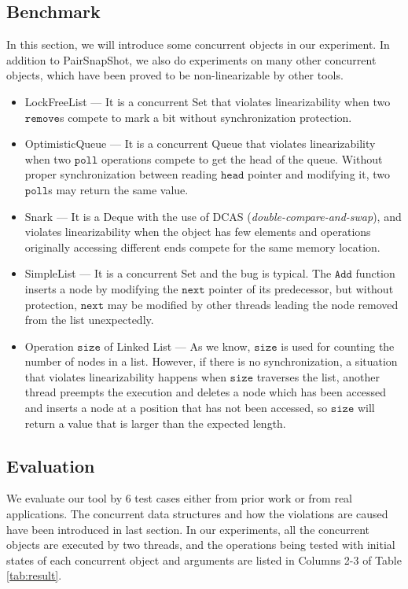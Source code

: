 \documentclass[runningheads]{llncs}
\begin{document}
\subsection{Benchmark}\label{sec:benchmarks}
In this section, we will introduce some concurrent objects in our experiment. 
In addition to PairSnapShot, we also do experiments on many other concurrent objects, which have been proved to be non-linearizable by other tools.

\begin{itemize}
  \item LockFreeList \cite{herlihy2012art} --- It is a concurrent Set that violates linearizability when two $\mathtt{remove}$s compete to mark a bit without synchronization protection.
  \item OptimisticQueue \cite{DBLP:conf/wdag/Ladan-MozesS04} --- It is a concurrent Queue that violates linearizability when two $\mathtt{poll}$ operations compete to get the head of the queue. Without proper synchronization between reading $\mathtt{head}$ pointer and modifying it, two $\mathtt{poll}$s may return the same value.

  \item Snark \cite{DBLP:conf/spaa/DohertyDGFLMMSS04} --- It is a Deque with the use of DCAS (\textit{double-compare-and-swap}), and violates linearizability when the object has few elements and operations originally accessing different ends compete for the same memory location.

  \item SimpleList \cite{DBLP:conf/pldi/VechevY08} --- It is a concurrent Set and the bug is typical. The $\mathtt{Add}$ function inserts a node by modifying the $\mathtt{next}$ pointer of its predecessor, but without protection, $\mathtt{next}$ may be modified by other threads leading the node removed from the list unexpectedly.
  \item Operation $\mathtt{size}$ of Linked List --- As we know, $\mathtt{size}$ is used for counting the number of nodes in a list. However, if there is no synchronization, a situation that violates linearizability happens when $\mathtt{size}$ traverses the list, another thread preempts the execution and deletes a node which has been accessed and inserts a node at a position that has not been accessed, so $\mathtt{size}$ will return a value that is larger than the expected length.
\end{itemize}



\subsection{Evaluation}
We evaluate our tool by 6 test cases either from prior work or from real applications.
The concurrent data structures and how the violations are caused have been introduced in last section. 
In our experiments, all the concurrent objects are executed by two threads, and the operations being tested with initial states of 
each concurrent object and arguments are listed in Columns 2-3 of Table \ref{tab:result}. 
\end{document}
